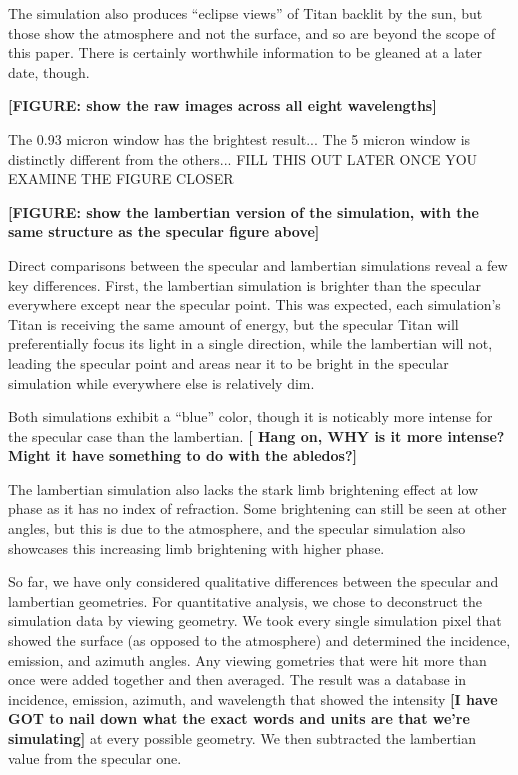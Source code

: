 \documentclass{article}
\begin{document}
The simulation also produces ``eclipse views'' of Titan backlit by the sun, but those show the atmosphere and not the surface, and so are beyond the scope of this paper. There is certainly worthwhile information to be gleaned at a later date, though. 

\textbf{\color{red} [FIGURE: show the raw images across all eight wavelengths] \color{black}}

\color{Green}The 0.93 micron window has the brightest result... The 5 micron window is distinctly different from the others... FILL THIS OUT LATER ONCE YOU EXAMINE THE FIGURE CLOSER\color{black}

\textbf{\color{red} [FIGURE: show the lambertian version of the simulation, with the same structure as the specular figure above] \color{black}}

Direct comparisons between the specular and lambertian simulations reveal a few key differences. First, the lambertian simulation is brighter than the specular everywhere except near the specular point. This was expected, each simulation's Titan is receiving the same amount of energy, but the specular Titan will preferentially focus its light in a single direction, while the lambertian will not, leading the specular point and areas near it to be bright in the specular simulation while everywhere else is relatively dim. 

Both simulations exhibit a ``blue'' color, though it is noticably more intense for the specular case than the lambertian. \textbf{\color{red}[ Hang on, WHY is it more intense? Might it have something to do with the abledos?]\color{black}}

The lambertian simulation also lacks the stark limb brightening effect at low phase as it has no index of refraction. Some brightening can still be seen at other angles, but this is due to the atmosphere, and the specular simulation also showcases this increasing limb brightening with higher phase.

So far, we have only considered qualitative differences between the specular and lambertian geometries. For quantitative analysis, we chose to deconstruct the simulation data by viewing geometry. We took every single simulation pixel that showed the surface (as opposed to the atmosphere) and determined the incidence, emission, and azimuth angles. Any viewing gometries that were hit more than once were added together and then averaged. The result was a database in incidence, emission, azimuth, and wavelength that showed the intensity \textbf{\color{red}[I have GOT to nail down what the exact words and units are that we're simulating]\color{black}} at every possible geometry. We then subtracted the lambertian value from the specular one.
\end{document}
